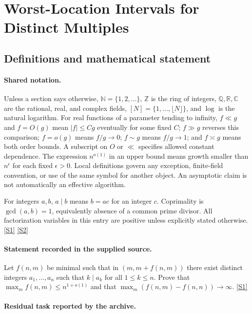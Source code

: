 \documentclass[11pt,a4paper]{article}
\newcommand{\N}{\mathbb{N}}
\newcommand{\Z}{\mathbb{Z}}
\newcommand{\Q}{\mathbb{Q}}
\newcommand{\R}{\mathbb{R}}
\newcommand{\C}{\mathbb{C}}
\newcommand{\sref}[2]{\hyperlink{source:#1:#2}{[S#2]}}
\begin{document}
\section{Worst-Location Intervals for Distinct Multiples}\label{statement}


\subsection{Definitions and mathematical statement}

\paragraph{Shared notation.}Unless a section says otherwise, $\N=\{1,2,\ldots\}$,
$\Z$ is the ring of integers, $\Q,\R,\C$ are the rational, real, and complex
fields, $[N]=\{1,\ldots,\lfloor N\rfloor\}$, and $\log$ is the natural
logarithm. For real functions of a parameter tending to infinity,
$f\ll g$ and $f=O(g)$ mean $|f|\leq Cg$ eventually for some fixed $C$;
$f\gg g$ reverses this comparison; $f=o(g)$ means $f/g\to0$;
$f\sim g$ means $f/g\to1$; and $f\asymp g$ means both order bounds.
A subscript on $O$ or $\ll$ specifies allowed constant dependence.
The expression $n^{o(1)}$ in an upper bound means growth smaller than
$n^\epsilon$ for each fixed $\epsilon>0$. Local definitions govern any
exception, finite-field convention, or use of the same symbol for another
object. An asymptotic claim is not automatically an effective algorithm.



For integers $a,b$, $a\mid b$ means $b=ac$ for an integer $c$. Coprimality is $\gcd(a,b)=1$, equivalently absence of a common prime divisor. All factorization variables in this entry are positive unless explicitly stated otherwise. \sref{statement}{1} \sref{statement}{2}

\paragraph{Statement recorded in the supplied source.}
Let $f(n,m)$ be minimal such that in $(m,m+f(n,m))$ there exist distinct integers $a_1,\ldots,a_n$ such that $k\mid a_k$ for all $1\leq k\leq n$. Prove that $ \max_m f(n,m) \leq n^{1+o(1)} $ and that $ \max_m (f(n,m)-f(n,n))\to \infty. $ \sref{statement}{1}

\paragraph{Residual task reported by the archive.}
\end{document}
